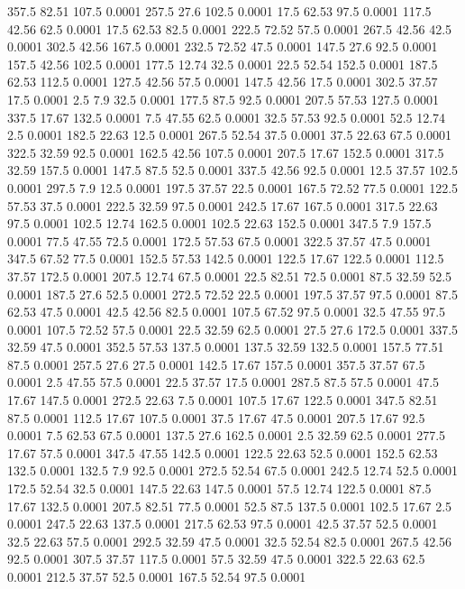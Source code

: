 357.5	82.51	107.5	0.0001
257.5	27.6	102.5	0.0001
17.5	62.53	97.5	0.0001
117.5	42.56	62.5	0.0001
17.5	62.53	82.5	0.0001
222.5	72.52	57.5	0.0001
267.5	42.56	42.5	0.0001
302.5	42.56	167.5	0.0001
232.5	72.52	47.5	0.0001
147.5	27.6	92.5	0.0001
157.5	42.56	102.5	0.0001
177.5	12.74	32.5	0.0001
22.5	52.54	152.5	0.0001
187.5	62.53	112.5	0.0001
127.5	42.56	57.5	0.0001
147.5	42.56	17.5	0.0001
302.5	37.57	17.5	0.0001
2.5	7.9	32.5	0.0001
177.5	87.5	92.5	0.0001
207.5	57.53	127.5	0.0001
337.5	17.67	132.5	0.0001
7.5	47.55	62.5	0.0001
32.5	57.53	92.5	0.0001
52.5	12.74	2.5	0.0001
182.5	22.63	12.5	0.0001
267.5	52.54	37.5	0.0001
37.5	22.63	67.5	0.0001
322.5	32.59	92.5	0.0001
162.5	42.56	107.5	0.0001
207.5	17.67	152.5	0.0001
317.5	32.59	157.5	0.0001
147.5	87.5	52.5	0.0001
337.5	42.56	92.5	0.0001
12.5	37.57	102.5	0.0001
297.5	7.9	12.5	0.0001
197.5	37.57	22.5	0.0001
167.5	72.52	77.5	0.0001
122.5	57.53	37.5	0.0001
222.5	32.59	97.5	0.0001
242.5	17.67	167.5	0.0001
317.5	22.63	97.5	0.0001
102.5	12.74	162.5	0.0001
102.5	22.63	152.5	0.0001
347.5	7.9	157.5	0.0001
77.5	47.55	72.5	0.0001
172.5	57.53	67.5	0.0001
322.5	37.57	47.5	0.0001
347.5	67.52	77.5	0.0001
152.5	57.53	142.5	0.0001
122.5	17.67	122.5	0.0001
112.5	37.57	172.5	0.0001
207.5	12.74	67.5	0.0001
22.5	82.51	72.5	0.0001
87.5	32.59	52.5	0.0001
187.5	27.6	52.5	0.0001
272.5	72.52	22.5	0.0001
197.5	37.57	97.5	0.0001
87.5	62.53	47.5	0.0001
42.5	42.56	82.5	0.0001
107.5	67.52	97.5	0.0001
32.5	47.55	97.5	0.0001
107.5	72.52	57.5	0.0001
22.5	32.59	62.5	0.0001
27.5	27.6	172.5	0.0001
337.5	32.59	47.5	0.0001
352.5	57.53	137.5	0.0001
137.5	32.59	132.5	0.0001
157.5	77.51	87.5	0.0001
257.5	27.6	27.5	0.0001
142.5	17.67	157.5	0.0001
357.5	37.57	67.5	0.0001
2.5	47.55	57.5	0.0001
22.5	37.57	17.5	0.0001
287.5	87.5	57.5	0.0001
47.5	17.67	147.5	0.0001
272.5	22.63	7.5	0.0001
107.5	17.67	122.5	0.0001
347.5	82.51	87.5	0.0001
112.5	17.67	107.5	0.0001
37.5	17.67	47.5	0.0001
207.5	17.67	92.5	0.0001
7.5	62.53	67.5	0.0001
137.5	27.6	162.5	0.0001
2.5	32.59	62.5	0.0001
277.5	17.67	57.5	0.0001
347.5	47.55	142.5	0.0001
122.5	22.63	52.5	0.0001
152.5	62.53	132.5	0.0001
132.5	7.9	92.5	0.0001
272.5	52.54	67.5	0.0001
242.5	12.74	52.5	0.0001
172.5	52.54	32.5	0.0001
147.5	22.63	147.5	0.0001
57.5	12.74	122.5	0.0001
87.5	17.67	132.5	0.0001
207.5	82.51	77.5	0.0001
52.5	87.5	137.5	0.0001
102.5	17.67	2.5	0.0001
247.5	22.63	137.5	0.0001
217.5	62.53	97.5	0.0001
42.5	37.57	52.5	0.0001
32.5	22.63	57.5	0.0001
292.5	32.59	47.5	0.0001
32.5	52.54	82.5	0.0001
267.5	42.56	92.5	0.0001
307.5	37.57	117.5	0.0001
57.5	32.59	47.5	0.0001
322.5	22.63	62.5	0.0001
212.5	37.57	52.5	0.0001
167.5	52.54	97.5	0.0001
